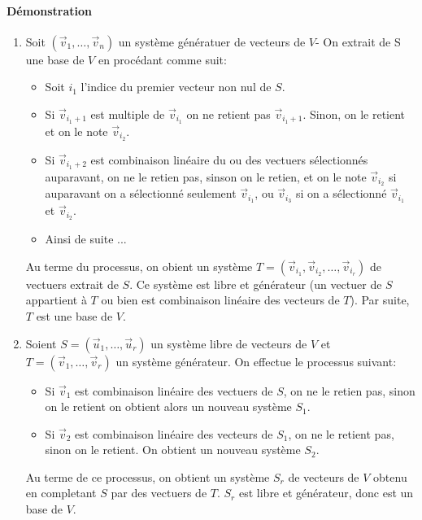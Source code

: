 \paragraph{Démonstration}
\begin{enumerate}
  \item Soit $(\vec{v}_1, \ldots, \vec{v}_n)$ un système génératuer de vecteurs de $V$- On extrait de S une base de $V$ en procédant comme suit:
    \begin{itemize}
      \item Soit $i_1$ l'indice du premier vecteur non nul de $S$.
      \item Si $\vec{v}_{i_1 + 1}$ est multiple de $\vec{v}_{i_1}$ on ne retient pas $\vec{v}_{i_1 + 1}$. Sinon, on le retient et on le note $\vec{v}_{i_2}$.
      \item Si $\vec{v}_{i_1 + 2}$ est combinaison linéaire du ou des vectuers sélectionnés auparavant, on ne le retien pas, sinson on le retien, et on le note $\vec{v}_{i_2}$ si auparavant on a sélectionné seulement $\vec{v}_{i_1}$, ou $\vec{v}_{i_3}$ si on a sélectionné $\vec{v}_{i_1}$ et $\vec{v}_{i_2}$.
      \item Ainsi de suite ...
    \end{itemize}
    Au terme du processus, on obient un système $T = (\vec{v}_{i_1}, \vec{v}_{i_2}, \ldots, \vec{v}_{i_r})$ de vectuers extrait de $S$. Ce système est libre et générateur (un vectuer de $S$ appartient à $T$ ou bien est combinaison linéaire des vecteurs de $T$). Par suite, $T$ est une base de $V$.
  
  \item Soient $S=(\vec{u}_1, \ldots, \vec{u}_r)$ un système libre de vecteurs de $V$ et $T=(\vec{v}_1, \ldots, \vec{v}_r)$ un système générateur. On effectue le processus suivant:
    \begin{itemize}
      \item Si $\vec{v}_1$ est combinaison linéaire des  vectuers de $S$, on ne le retien pas, sinon on le retient on obtient alors un nouveau système $S_1$.
      \item Si $\vec{v}_2$ est combinaison linéaire des vecteurs de $S_1$, on ne le retient pas, sinon on le retient. On obtient un nouveau système $S_2$.
    \end{itemize}
    Au terme de ce processus, on obtient un système $S_r$ de vecteurs de $V$ obtenu en completant $S$ par des vectuers de $T$. $S_r$ est libre et générateur, donc est un base de $V$.
    

\end{enumerate}
